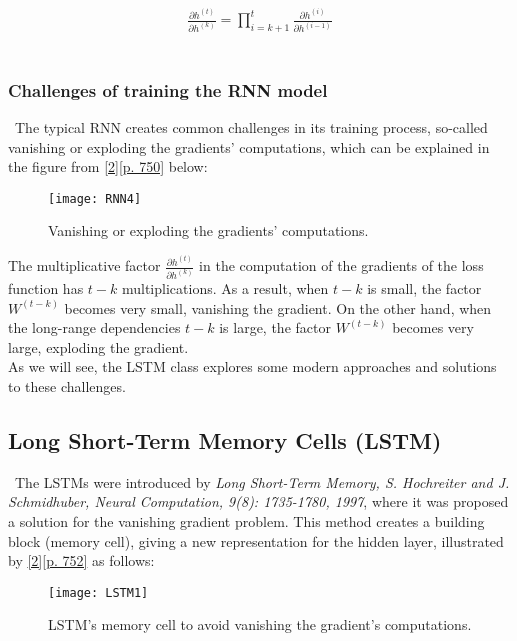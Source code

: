 \begin{align*}
\frac{\partial h^{(t)}}{\partial h^{(k)}} = \prod_{i=k+1}^{t} \frac{\partial h^{(i)}}{\partial h^{(i-1)}}
\end{align*}\\

\subsubsection{Challenges of training the RNN model}
\label{chap:Challenges of training the RNN model}

\quad \, The typical RNN creates common challenges in its training process, so-called vanishing or exploding the gradients' computations, which can be explained in the figure from \hyperref[Bib:Sebastian Raschka, Vahid Mirjalili]{[2][p. 750]} below:

\begin{figure}[H]
\label{fig:RNN4}
\centering
\texttt{[image: RNN4]}
\caption{Vanishing or exploding the gradients' computations.}
\end{figure}

The multiplicative factor $\frac{\partial h^{(t)}}{\partial h^{(k)}}$ in the computation of the gradients of the loss function has $t-k$ multiplications. As a result, when $t-k$ is small, the factor $W^{(t-k)}$ becomes very small, vanishing the gradient. On the other hand, when the long-range dependencies $t-k$ is large, the factor $W^{(t-k)}$ becomes very large, exploding the gradient.\\

As we will see, the LSTM class explores some modern approaches and solutions to these challenges.

\subsection{Long Short-Term Memory Cells (LSTM)}
\label{chap:Long Short-Term Memory Cells}

\quad \, The LSTMs were introduced by \textit{Long Short-Term Memory, S. Hochreiter and J. Schmidhuber, Neural Computation, 9(8): 1735-1780, 1997}, where it was proposed a solution for the vanishing gradient problem. This method creates a building block (memory cell), giving a new representation for the hidden layer, illustrated by \hyperref[Bib:Sebastian Raschka, Vahid Mirjalili]{[2][p. 752]} as follows:

\begin{figure}[H]
\label{fig:LSTM1}
\centering
\texttt{[image: LSTM1]}
\caption{LSTM's memory cell to avoid vanishing the gradient's computations.}
\end{figure}

